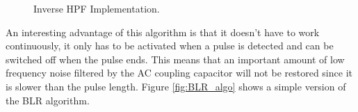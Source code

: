 \documentclass[a4paper,11pt]{report}
\begin{document}
\begin{figure}[!tbp]
  \centering
  \hfill
  \caption{Inverse HPF Implementation.}
  \label{fig:FEE_check}
\end{figure}

\par An interesting advantage of this algorithm is that it doesn't have to work continuously, it only has to be activated when a pulse is detected and can be switched off when the pulse ends. This means that an important amount of low frequency noise filtered by the AC coupling capacitor will not be restored since it is slower than the pulse length. Figure \ref{fig:BLR_algo} shows a simple version of the BLR algorithm.
\end{document}
